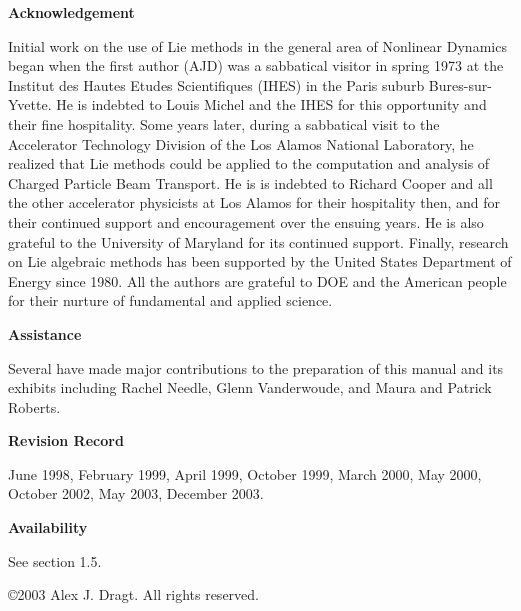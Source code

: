 {\vspace{.2in}
\centerline{\bf Acknowledgement}
Initial work on the use of Lie methods in the general area of Nonlinear
Dynamics began when the first author (AJD) was a sabbatical visitor in
spring 1973 at the Institut des Hautes Etudes Scientifiques (IHES) in the Paris suburb
Bures-sur-Yvette.  He is indebted to Louis Michel and the IHES for this
opportunity and their fine hospitality.  Some years later, during a
sabbatical visit to the Accelerator Technology Division of the Los Alamos National
Laboratory, he realized that Lie methods could be applied to the
computation and analysis of Charged Particle Beam Transport.  He is is
indebted to
Richard Cooper and all the other accelerator physicists at Los Alamos for their
hospitality then, and for their continued support and encouragement over
the ensuing years.  He is also grateful to the University of Maryland for
its continued support.  Finally, research on Lie algebraic methods has been
supported by the United States Department of Energy since 1980.  All the authors are
grateful to DOE and the American people for their nurture of fundamental and applied
science.

\vspace{.2in}
\centerline{\bf Assistance}
Several have made major contributions to the preparation of this manual
and its exhibits including Rachel Needle, Glenn Vanderwoude, and Maura and
Patrick Roberts.

\vspace{.2in}
\centerline{\bf Revision Record}
June 1998, February 1999, April 1999, October 1999, March 2000, May 2000, October 2002, May 2003, December 2003.

\vspace{.2in}
\centerline{\bf Availability}
See section 1.5.

\vspace{.35in}

\copyright 2003 Alex J. Dragt.  All rights reserved.}

